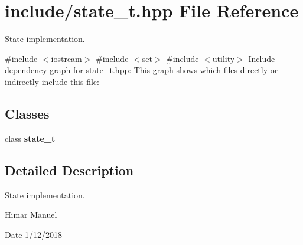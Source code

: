 \section{include/state\+\_\+t.hpp File Reference}
\label{state__t_8hpp}


State implementation.  


{\ttfamily \#include $<$iostream$>$}\newline
{\ttfamily \#include $<$set$>$}\newline
{\ttfamily \#include $<$utility$>$}\newline
Include dependency graph for state\+\_\+t.\+hpp\+:
This graph shows which files directly or indirectly include this file\+:
\subsection*{Classes}
\begin{DoxyCompactItemize}
\item 
class \textbf{ state\+\_\+t}
\end{DoxyCompactItemize}


\subsection{Detailed Description}
State implementation. 

Himar Manuel \begin{DoxyDate}{Date}
1/12/2018 
\end{DoxyDate}
